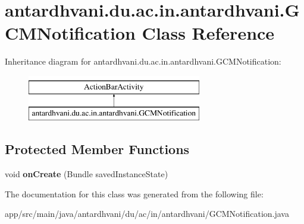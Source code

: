 \hypertarget{classantardhvani_1_1du_1_1ac_1_1in_1_1antardhvani_1_1_g_c_m_notification}{}\section{antardhvani.\+du.\+ac.\+in.\+antardhvani.\+G\+C\+M\+Notification Class Reference}
\label{classantardhvani_1_1du_1_1ac_1_1in_1_1antardhvani_1_1_g_c_m_notification}
Inheritance diagram for antardhvani.\+du.\+ac.\+in.\+antardhvani.\+G\+C\+M\+Notification\+:\begin{figure}[H]
\begin{center}
\leavevmode
\includegraphics[height=2.000000cm]{classantardhvani_1_1du_1_1ac_1_1in_1_1antardhvani_1_1_g_c_m_notification}
\end{center}
\end{figure}
\subsection*{Protected Member Functions}
\begin{DoxyCompactItemize}
\item 
\hypertarget{classantardhvani_1_1du_1_1ac_1_1in_1_1antardhvani_1_1_g_c_m_notification_a9d8e914359259a00051097f7063ca1fd}{}void {\bfseries on\+Create} (Bundle saved\+Instance\+State)\label{classantardhvani_1_1du_1_1ac_1_1in_1_1antardhvani_1_1_g_c_m_notification_a9d8e914359259a00051097f7063ca1fd}

\end{DoxyCompactItemize}


The documentation for this class was generated from the following file\+:\begin{DoxyCompactItemize}
\item 
app/src/main/java/antardhvani/du/ac/in/antardhvani/G\+C\+M\+Notification.\+java\end{DoxyCompactItemize}
